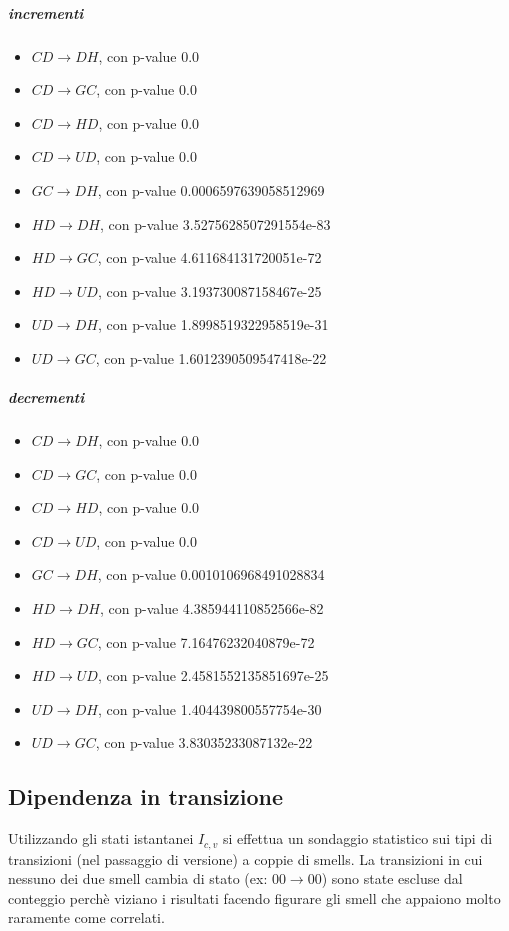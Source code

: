 \documentclass[a4paper,11pt,oneside, table]{article}
\begin{document}
  \subparagraph{incrementi}
  \begin{itemize}
    \item $CD \rightarrow DH$, con p-value 0.0
    \item $CD \rightarrow GC$, con p-value 0.0
    \item $CD \rightarrow HD$, con p-value 0.0
    \item $CD \rightarrow UD$, con p-value 0.0
    \item $GC \rightarrow DH$, con p-value 0.0006597639058512969
    \item $HD \rightarrow DH$, con p-value 3.5275628507291554e-83
    \item $HD \rightarrow GC$, con p-value 4.611684131720051e-72
    \item $HD \rightarrow UD$, con p-value 3.193730087158467e-25
    \item $UD \rightarrow DH$, con p-value 1.8998519322958519e-31
    \item $UD \rightarrow GC$, con p-value 1.6012390509547418e-22
  \end{itemize}

  \subparagraph{decrementi}
  \begin{itemize}
    \item $CD \rightarrow DH$, con p-value 0.0
    \item $CD \rightarrow GC$, con p-value 0.0
    \item $CD \rightarrow HD$, con p-value 0.0
    \item $CD \rightarrow UD$, con p-value 0.0
    \item $GC \rightarrow DH$, con p-value 0.0010106968491028834
    \item $HD \rightarrow DH$, con p-value 4.385944110852566e-82
    \item $HD \rightarrow GC$, con p-value 7.16476232040879e-72
    \item $HD \rightarrow UD$, con p-value 2.4581552135851697e-25
    \item $UD \rightarrow DH$, con p-value 1.404439800557754e-30
    \item $UD \rightarrow GC$, con p-value 3.83035233087132e-22
  \end{itemize}

  \subsection{Dipendenza in transizione}
  Utilizzando gli stati istantanei $I_{c,v}$ si effettua un sondaggio statistico sui tipi di transizioni (nel passaggio di versione) a coppie di smells. La transizioni in cui nessuno dei due smell cambia di stato (ex: $00 \rightarrow 00$) sono state escluse dal conteggio perch\`e viziano i risultati facendo figurare gli smell che appaiono molto raramente come correlati.
\end{document}
